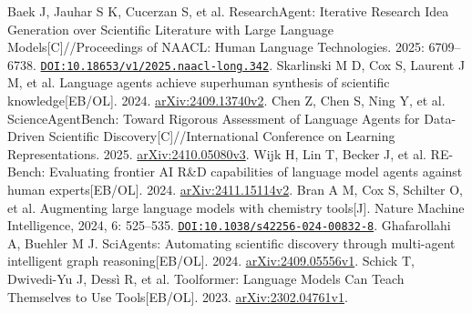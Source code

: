  Baek J, Jauhar S K, Cucerzan S, et al. ResearchAgent: Iterative Research Idea Generation over Scientific Literature with Large Language Models[C]//Proceedings of NAACL: Human Language Technologies. 2025: 6709--6738. \href{https://doi.org/10.18653/v1/2025.naacl-long.342}{\nolinkurl{DOI:10.18653/v1/2025.naacl-long.342}}.
 Skarlinski M D, Cox S, Laurent J M, et al. Language agents achieve superhuman synthesis of scientific knowledge[EB/OL]. 2024. \href{https://arxiv.org/abs/2409.13740v2}{arXiv:2409.13740v2}.
 Chen Z, Chen S, Ning Y, et al. ScienceAgentBench: Toward Rigorous Assessment of Language Agents for Data-Driven Scientific Discovery[C]//International Conference on Learning Representations. 2025. \href{https://arxiv.org/abs/2410.05080v3}{arXiv:2410.05080v3}.
 Wijk H, Lin T, Becker J, et al. RE-Bench: Evaluating frontier AI R\&D capabilities of language model agents against human experts[EB/OL]. 2024. \href{https://arxiv.org/abs/2411.15114v2}{arXiv:2411.15114v2}.
 Bran A M, Cox S, Schilter O, et al. Augmenting large language models with chemistry tools[J]. Nature Machine Intelligence, 2024, 6: 525--535. \href{https://doi.org/10.1038/s42256-024-00832-8}{\nolinkurl{DOI:10.1038/s42256-024-00832-8}}.
 Ghafarollahi A, Buehler M J. SciAgents: Automating scientific discovery through multi-agent intelligent graph reasoning[EB/OL]. 2024. \href{https://arxiv.org/abs/2409.05556v1}{arXiv:2409.05556v1}.
 Schick T, Dwivedi-Yu J, Dessì R, et al. Toolformer: Language Models Can Teach Themselves to Use Tools[EB/OL]. 2023. \href{https://arxiv.org/abs/2302.04761v1}{arXiv:2302.04761v1}.
